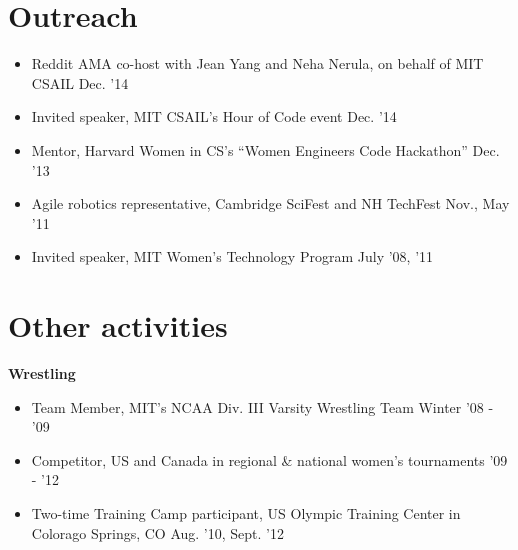 \documentclass[margin]{res}
\begin{document}
\begin{resume}
\section{Outreach}
\begin{itemize}[leftmargin=*] \itemsep -2pt
\item Reddit AMA co-host with Jean Yang and Neha Nerula, on behalf of MIT CSAIL \hfill Dec. '14
\item Invited speaker, MIT CSAIL's Hour of Code event \hfill Dec. '14
\item Mentor, Harvard Women in CS's ``Women Engineers Code Hackathon'' \hfill Dec. '13
\item Agile robotics representative, Cambridge SciFest and NH TechFest \hfill Nov., May '11
\item Invited speaker, MIT Women's Technology Program \hfill July '08, '11 \\
\end{itemize}

\section{Other activities}
{\bf Wrestling}
\begin{itemize}[leftmargin=*] \itemsep -2pt
\item Team Member, MIT's NCAA Div. III Varsity Wrestling Team \hfill Winter '08 - '09
\item Competitor, US and Canada in regional \& national women's tournaments \hfill '09 - '12
\item Two-time Training Camp participant, US Olympic Training Center in Colorago Springs, CO \hfill Aug. '10, Sept. '12


\end{itemize}

\end{resume} 
 
\end{document}
